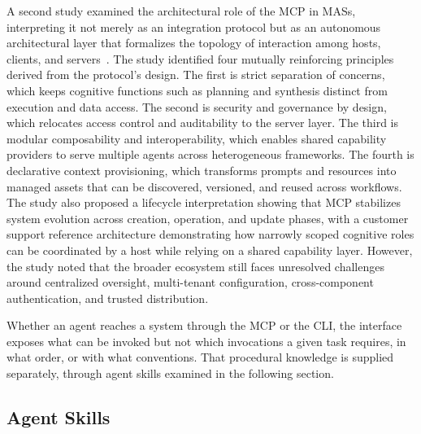\documentclass[
english,                 %
bibtex,                  %
]{kththesis}
\numberwithin{listing}{chapter}
\begin{document}
A second study examined the architectural role of the \gls{MCP} in \glspl{MAS}, interpreting it not merely as an integration protocol but as an autonomous architectural layer that formalizes the topology of interaction among hosts, clients, and servers~\cite{zuykov_architectural_2026}. The study identified four mutually reinforcing principles derived from the protocol's design. The first is strict separation of concerns, which keeps cognitive functions such as planning and synthesis distinct from execution and data access. The second is security and governance by design, which relocates access control and auditability to the server layer. The third is modular composability and interoperability, which enables shared capability providers to serve multiple agents across heterogeneous frameworks. The fourth is declarative context provisioning, which transforms prompts and resources into managed assets that can be discovered, versioned, and reused across workflows. The study also proposed a lifecycle interpretation showing that \gls{MCP} stabilizes system evolution across creation, operation, and update phases, with a customer support reference architecture demonstrating how narrowly scoped cognitive roles can be coordinated by a host while relying on a shared capability layer. However, the study noted that the broader ecosystem still faces unresolved challenges around centralized oversight, multi-tenant configuration, cross-component authentication, and trusted distribution.

Whether an agent reaches a system through the \gls{MCP} or the \gls{CLI}, the interface exposes what can be invoked but not which invocations a given task requires, in what order, or with what conventions. That procedural knowledge is supplied separately, through agent skills examined in the following section.

\subsection{Agent Skills}
\label{sec:bg_agent_skills}
\glsresetall
\end{document}
